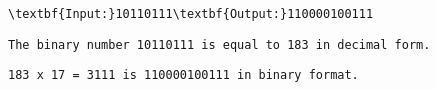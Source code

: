 \begin{verbatim}
\textbf{Input:}10110111\textbf{Output:}110000100111\end{verbatim}
\begin{verbatim}
The binary number 10110111 is equal to 183 in decimal form. \end{verbatim}
\begin{verbatim}
183 x 17 = 3111 is 110000100111 in binary format.\end{verbatim}